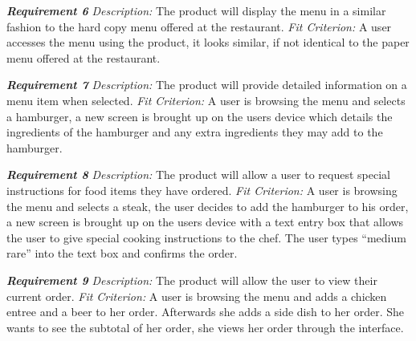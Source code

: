 \documentclass[12pt, titlepage]{article}
\begin{document}
\textbf{\textit{Requirement 6}}\newline
\textit{Description:}\newline
The product will display the menu in a similar fashion to the hard copy menu offered at the restaurant. \newline\newline
\textit{Fit Criterion:}\newline 
A user accesses the menu using the product, it looks similar, if not identical to the paper menu offered at the restaurant.
\newline

\textbf{\textit{Requirement 7}}\newline
\textit{Description:}\newline
The product will provide detailed information on a menu item when selected. \newline\newline
\textit{Fit Criterion:}\newline 
A user is browsing the menu and selects a hamburger, a new screen is brought up on the users device which details the ingredients of the hamburger and any extra ingredients they may add to the hamburger.
\newline

\textbf{\textit{Requirement 8}}\newline
\textit{Description:}\newline
The product will allow a user to request special instructions for food items they have ordered. \newline\newline
\textit{Fit Criterion:}\newline 
A user is browsing the menu and selects a steak, the user decides to add the hamburger to his order, a new screen is brought up on the users device with a text entry box that allows the user to give special cooking instructions to the chef. The user types “medium rare” into the text box and confirms the order.
\newline

\textbf{\textit{Requirement 9}}\newline
\textit{Description:}\newline
The product will allow the user to view their current order. \newline\newline
\textit{Fit Criterion:}\newline 
A user is browsing the menu and adds a chicken entree and a beer to her order. Afterwards she adds a side dish to her order. She wants to see the subtotal of her order, she views her order through the interface.
\newline
\end{document}
